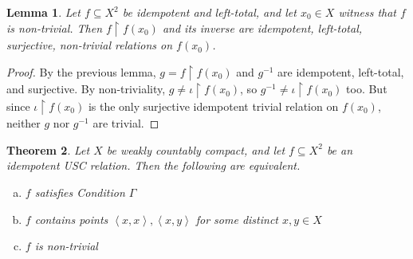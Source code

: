 \documentclass{article}
\newcommand{\tuple}[1]{\left\langle{#1}\right\rangle}
\newcommand{\rest}{\upharpoonright}
\theoremstyle{plain}
\newtheorem{theorem}{Theorem}
\newtheorem{lemma}[theorem]{Lemma}
\theoremstyle{definition}
\theoremstyle{remark}
\begin{document}
\begin{lemma}\label{lemma-nontrivial-idempotent}
  Let \(f\subseteq X^2\) be idempotent and left-total, and let \(x_0\in X\)
  witness that \(f\) is non-trivial.
  Then \(f\rest f(x_0)\) and its inverse are idempotent, left-total,
  surjective, non-trivial relations on \(f(x_0)\).
\end{lemma}
\begin{proof}
  By the previous lemma, \(g=f\rest f(x_0)\) and \(g^{-1}\) 
  are idempotent, left-total, and surjective.
  By non-triviality, \(g\not=\iota \rest f(x_0)\),
  so \(g^{-1}\not=\iota\rest f(x_0)\) too.
  But since \(\iota\rest f(x_0)\) 
  is the only surjective idempotent trivial relation on \(f(x_0)\),
  neither \(g\) nor \(g^{-1}\) are trivial.
\end{proof}

\begin{theorem}
  Let \(X\) be weakly countably compact, and let \(f\subseteq X^2\) be
  an idempotent USC relation. Then the following are equivalent.
  \begin{enumerate}[a)]
  \item \(f\) satisfies Condition \(\Gamma\)
  \item \(f\) contains points \(\tuple{x,x},\tuple{x,y}\) for some distinct
        \(x,y\in X\)
  \item \(f\) is non-trivial
  \end{enumerate}
\end{theorem}
\end{document}
